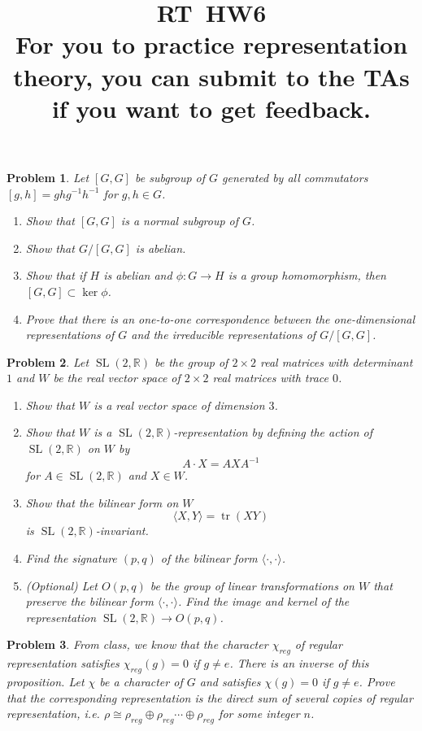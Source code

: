 \documentclass{article}
\title{RT\ HW6 \\ For you to practice representation theory, you can submit to the TAs if you want to get feedback.}
\newtheorem{ex}{Problem}
\newcommand{\R}{\mathbb{R}}
\newcommand{\tr}{\operatorname{tr}}
\newcommand{\SL}{\operatorname{SL}}
\begin{document}
\maketitle      

\begin{ex}
  Let $[G,G]$ be subgroup of $G$ generated by all commutators $[g,h]=ghg^{-1}h^{-1}$ for $g,h\in G$. 
  \begin{enumerate}
    \item Show that $[G,G]$ is a normal subgroup of $G$.
    \item Show that $G/[G,G]$ is abelian.
    \item Show that if $H$ is abelian and $\phi\colon G \to H$ is a group homomorphism, then $[G,G]\subset \ker \phi$.
    \item Prove that there is an one-to-one correspondence between the one-dimensional representations of $G$ and the irreducible representations of $G/[G,G]$.
  \end{enumerate}
\end{ex}

\begin{ex}
Let $\SL(2,\R)$ be the group of $2\times 2$ real matrices with determinant $1$ and $W$ be the real vector space of $2\times 2$ real matrices with trace $0$.
\begin{enumerate}
  \item Show that $W$ is a real vector space of dimension $3$.
  \item Show that $W$ is a $\SL(2,\R)$-representation by defining the action of $\SL(2,\R)$ on $W$ by
  \[  A\cdot X = AXA^{-1} \]
  for $A\in \SL(2,\R)$ and $X\in W$.
  \item Show that the bilinear form on $W$ \[
  \langle X,Y \rangle = \tr(XY)
  \]
  is $\SL(2,\R)$-invariant.
  \item Find the signature $(p,q)$ of the bilinear form $\langle \cdot, \cdot \rangle$.
  \item (Optional) Let $O(p,q)$ be the group of linear transformations on $W$ that preserve the bilinear form $\langle \cdot, \cdot \rangle$. Find the image and kernel of the representation $\SL(2,\R) \to O(p,q)$.
\end{enumerate}
\end{ex}

\begin{ex}
  From class, we know that the character $\chi_{reg}$ of regular representation satisfies $\chi_{reg}(g)=0$ if $g\neq e$. There is an inverse of this proposition. Let $\chi$ be a character of $G$ and satisfies $\chi(g)=0$ if $g\neq e$. Prove that the corresponding representation is the direct sum of several copies of regular representation, i.e. $\rho\cong \rho_{reg}\oplus \rho_{reg}\cdots \oplus \rho_{reg}$ for some integer $n$. 
\end{ex}
\end{document}
